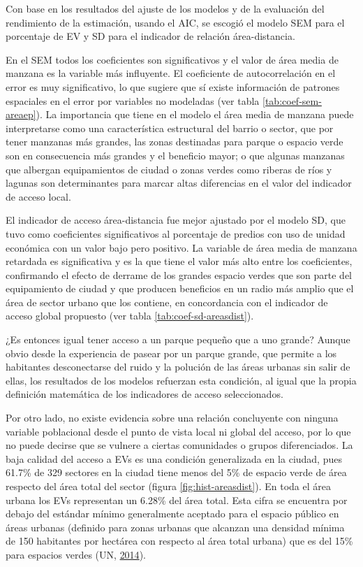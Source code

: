 \documentclass[12pt,a4paper,oneside, openany]{book}
\theoremstyle{definition}
\theoremstyle{definition}
\theoremstyle{definition}
\theoremstyle{remark}
\begin{document}
Con base en los resultados del ajuste de los modelos y de la evaluación
del rendimiento de la estimación, usando el AIC, se escogió el modelo
SEM para el porcentaje de EV y SD para el indicador de relación
área-distancia.

En el SEM todos los coeficientes son significativos y el valor de área
media de manzana es la variable más influyente. El coeficiente de
autocorrelación en el error es muy significativo, lo que sugiere que sí
existe información de patrones espaciales en el error por variables no
modeladas (ver tabla \ref{tab:coef-sem-areaep}). La importancia que
tiene en el modelo el área media de manzana puede interpretarse como una
característica estructural del barrio o sector, que por tener manzanas
más grandes, las zonas destinadas para parque o espacio verde son en
consecuencia más grandes y el beneficio mayor; o que algunas manzanas
que albergan equipamientos de ciudad o zonas verdes como riberas de ríos
y lagunas son determinantes para marcar altas diferencias en el valor
del indicador de acceso local.

El indicador de acceso área-distancia fue mejor ajustado por el modelo
SD, que tuvo como coeficientes significativos al porcentaje de predios
con uso de unidad económica con un valor bajo pero positivo. La variable
de área media de manzana retardada es significativa y es la que tiene el
valor más alto entre los coeficientes, confirmando el efecto de derrame
de los grandes espacio verdes que son parte del equipamiento de ciudad y
que producen beneficios en un radio más amplio que el área de sector
urbano que los contiene, en concordancia con el indicador de acceso
global propuesto (ver tabla \ref{tab:coef-sd-areasdist}).

¿Es entonces igual tener acceso a un parque pequeño que a uno grande?
Aunque obvio desde la experiencia de pasear por un parque grande, que
permite a los habitantes desconectarse del ruido y la polución de las
áreas urbanas sin salir de ellas, los resultados de los modelos
refuerzan esta condición, al igual que la propia definición matemática
de los indicadores de acceso seleccionados.

Por otro lado, no existe evidencia sobre una relación concluyente con
ninguna variable poblacional desde el punto de vista local ni global del
acceso, por lo que no puede decirse que se vulnere a ciertas comunidades
o grupos diferenciados. La baja calidad del acceso a EVs es una
condición generalizada en la ciudad, pues 61.7\% de 329 sectores en la
ciudad tiene menos del 5\% de espacio verde de área respecto del área
total del sector (figura \ref{fig:hist-areasdist}). En toda el área
urbana los EVs representan un 6.28\% del área total. Esta cifra se
encuentra por debajo del estándar mínimo generalmente aceptado para el
espacio público en áreas urbanas (definido para zonas urbanas que
alcanzan una densidad mínima de 150 habitantes por hectárea con respecto
al área total urbana) que es del 15\% para espacios verdes (UN,
\protect\hyperlink{ref-un2014sdg}{2014}).
\end{document}
